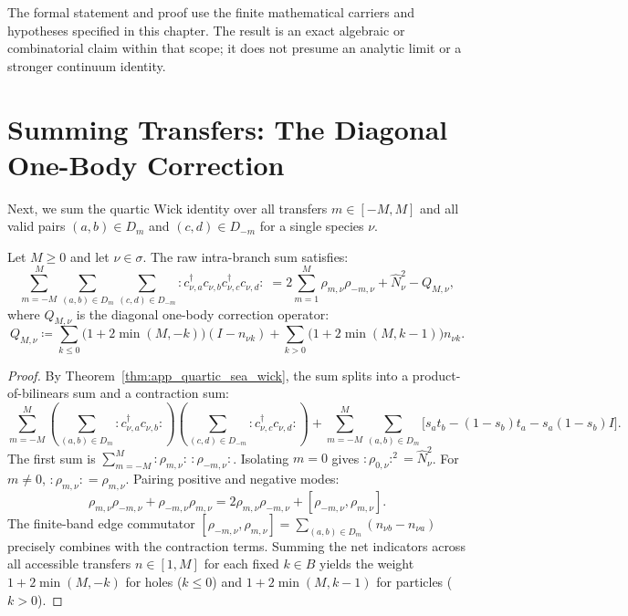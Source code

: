 \begin{remark}
The formal statement and proof use the finite mathematical carriers and hypotheses specified in this chapter. The result is an exact algebraic or combinatorial claim within that scope; it does not presume an analytic limit or a stronger continuum identity.
\end{remark}

\section{Summing Transfers: The Diagonal One-Body Correction}

Next, we sum the quartic Wick identity over all transfers $m \in [-M, M]$ and all valid pairs $(a, b) \in D_m$ and $(c, d) \in D_{-m}$ for a single species $\nu$.

\begin{theorem}
\label{thm:app_species_raw_current}
Let $M \ge 0$ and let $\nu \in \sigma$. The raw intra-branch sum satisfies:
\begin{equation}
\sum_{m=-M}^M \sum_{(a, b) \in D_m} \sum_{(c, d) \in D_{-m}} :\! c_{\nu, a}^\dagger c_{\nu, b} c_{\nu, c}^\dagger c_{\nu, d} \!: \;= 2 \sum_{m=1}^M \rho_{m, \nu} \rho_{-m, \nu} + \hat{N}_\nu^2 - Q_{M, \nu},
\end{equation}
where $Q_{M, \nu}$ is the diagonal one-body correction operator:
\begin{equation}
Q_{M, \nu} \coloneqq \sum_{k \le 0} \Big( 1 + 2\min(M, -k) \Big) (I - n_{\nu k}) + \sum_{k > 0} \Big( 1 + 2\min(M, k-1) \Big) n_{\nu k}.
\end{equation}
\end{theorem}

\begin{proof}
By Theorem~\ref{thm:app_quartic_sea_wick}, the sum splits into a product-of-bilinears sum and a contraction sum:
\[
\sum_{m=-M}^M \left( \sum_{(a, b) \in D_m} :\! c_{\nu, a}^\dagger c_{\nu, b} \!: \right) \left( \sum_{(c, d) \in D_{-m}} :\! c_{\nu, c}^\dagger c_{\nu, d} \!: \right) + \sum_{m=-M}^M \sum_{(a, b) \in D_m} \Big[ s_a t_b - (1-s_b)t_a - s_a(1-s_b)I \Big].
\]
The first sum is $\sum_{m=-M}^M :\! \rho_{m, \nu} \!:\, :\! \rho_{-m, \nu} \!:$. Isolating $m = 0$ gives $:\!\rho_{0, \nu}\!:^2 = \hat{N}_\nu^2$. For $m \neq 0$, $:\!\rho_{m, \nu}\!: = \rho_{m, \nu}$. Pairing positive and negative modes:
\[
\rho_{m, \nu} \rho_{-m, \nu} + \rho_{-m, \nu} \rho_{m, \nu} = 2 \rho_{m, \nu} \rho_{-m, \nu} + [\rho_{-m, \nu}, \rho_{m, \nu}].
\]
The finite-band edge commutator $[\rho_{-m, \nu}, \rho_{m, \nu}] = \sum_{(a, b) \in D_m} (n_{\nu b} - n_{\nu a})$ precisely combines with the contraction terms.
Summing the net indicators across all accessible transfers $n \in [1, M]$ for each fixed $k \in B$ yields the weight $1 + 2\min(M, -k)$ for holes ($k \le 0$) and $1 + 2\min(M, k-1)$ for particles ($k > 0$).
\end{proof}

